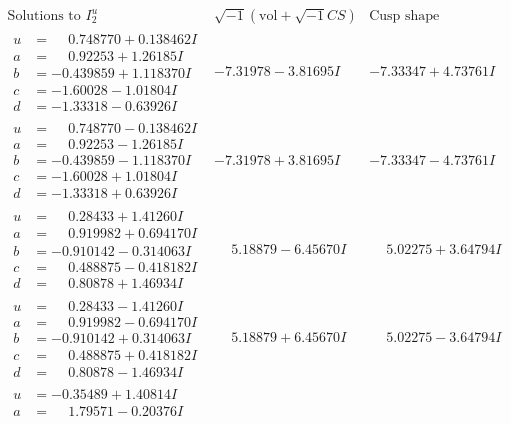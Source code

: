 \documentclass[1p]{elsarticle_modified}
\theoremstyle{definition}
\newcommand{\I}{\sqrt{-1}}
\begin{document}
$$\begin{array}{c|c|c}  
\text{Solutions to }I^u_{2}& \I (\text{vol} + \sqrt{-1}CS) & \text{Cusp shape}\\
 \hline 
\begin{aligned}
u &= \phantom{-}0.748770 + 0.138462 I \\
a &= \phantom{-}0.92253 + 1.26185 I \\
b &= -0.439859 + 1.118370 I \\
c &= -1.60028 - 1.01804 I \\
d &= -1.33318 - 0.63926 I\end{aligned}
 & -7.31978 - 3.81695 I & -7.33347 + 4.73761 I \\ \hline\begin{aligned}
u &= \phantom{-}0.748770 - 0.138462 I \\
a &= \phantom{-}0.92253 - 1.26185 I \\
b &= -0.439859 - 1.118370 I \\
c &= -1.60028 + 1.01804 I \\
d &= -1.33318 + 0.63926 I\end{aligned}
 & -7.31978 + 3.81695 I & -7.33347 - 4.73761 I \\ \hline\begin{aligned}
u &= \phantom{-}0.28433 + 1.41260 I \\
a &= \phantom{-}0.919982 + 0.694170 I \\
b &= -0.910142 - 0.314063 I \\
c &= \phantom{-}0.488875 - 0.418182 I \\
d &= \phantom{-}0.80878 + 1.46934 I\end{aligned}
 & \phantom{-}5.18879 - 6.45670 I & \phantom{-}5.02275 + 3.64794 I \\ \hline\begin{aligned}
u &= \phantom{-}0.28433 - 1.41260 I \\
a &= \phantom{-}0.919982 - 0.694170 I \\
b &= -0.910142 + 0.314063 I \\
c &= \phantom{-}0.488875 + 0.418182 I \\
d &= \phantom{-}0.80878 - 1.46934 I\end{aligned}
 & \phantom{-}5.18879 + 6.45670 I & \phantom{-}5.02275 - 3.64794 I \\ \hline\begin{aligned}
u &= -0.35489 + 1.40814 I \\
a &= \phantom{-}1.79571 - 0.20376 I \\

\end{aligned}
\end{array}$$
\end{document}

